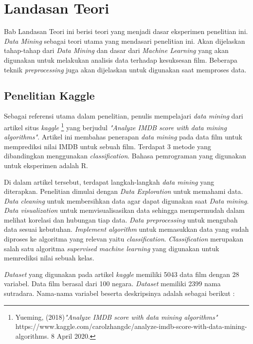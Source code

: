 \chapter{Landasan Teori}
\label{chap:teori}
Bab Landasan Teori ini berisi teori yang menjadi dasar eksperimen penelitian ini. \textit{Data Mining} sebagai teori utama yang mendasari penelitian ini. Akan dijelaskan tahap-tahap dari \textit{Data Mining} dan dasar dari \textit{Machine Learning} yang akan digunakan untuk melakukan analisis data terhadap kesuksesan film. Beberapa teknik \textit{preprocessing} juga akan dijelaskan untuk digunakan saat memproses data. 

\section{Penelitian Kaggle}
Sebagai referensi utama dalam penelitian, penulis mempelajari \textit{data mining} dari artikel situs \textit{kaggle} \footnote{Yueming, (2018)\textit{"Analyze IMDB score with data mining algorithms"} https://www.kaggle.com/carolzhangdc/analyze-imdb-score-with-data-mining-algorithms. 8 April 2020.} yang berjudul \textit{"Analyze IMDB score with data mining algorithms"}. Artikel ini membahas penerapan \textit{data mining} pada data film  untuk memprediksi nilai IMDB untuk sebuah film. Terdapat 3 metode yang dibandingkan menggunakan \textit{classification}. Bahasa pemrograman yang digunakan untuk eksperimen adalah R.

Di dalam artikel tersebut, terdapat langkah-langkah \textit{data mining} yang diterapkan. Penelitian dimulai dengan \textit{Data Exploration} untuk memahami data. \textit{Data cleaning} untuk membersihkan data agar dapat digunakan saat \textit{Data mining}. \textit{Data visualization} untuk memvisualisasikan data sehingga mempermudah dalam melihat korelasi dan hubungan tiap data. \textit{Data preprocessing} untuk mengubah data sesuai kebutuhan. \textit{Implement algorithm} untuk memasukkan data yang sudah diproses ke algoritma yang relevan yaitu \textit{classification}. \textit{Classification} merupakan salah satu algoritma \textit{supervised machine learning} yang digunakan untuk memrediksi nilai sebuah kelas.

\textit{Dataset} yang digunakan pada artikel \textit{kaggle} memiliki 5043 data film dengan 28 variabel. Data film berasal dari 100 negara. \textit{Dataset} memiliki 2399 nama sutradara. Nama-nama variabel beserta deskripsinya adalah sebagai berikut :

